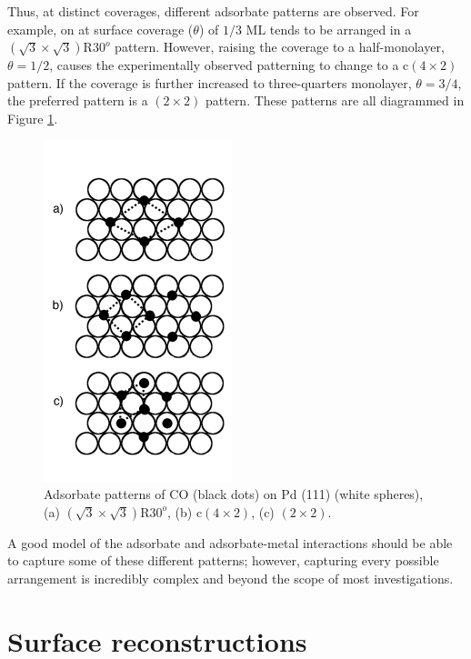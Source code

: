Thus, at distinct coverages, different adsorbate patterns are observed. For example,
 on  at surface coverage ($\theta$) of $1/3$ ML tends to be arranged in a
$(\sqrt{3}\times\sqrt{3})\textrm{R}30^o$ pattern. However, raising the coverage
to a half-monolayer, $\theta = 1/2$, causes the experimentally observed
patterning to change to a c$(4\times2)$ pattern. If the coverage is further
increased to three-quarters monolayer, $\theta = 3/4$, the preferred pattern is
a $(2\times2)$ pattern.\citep{Guo:1989aa} These patterns are all diagrammed in
Figure \ref{fig:patterns}.

\begin{figure}[p!]
\centering
  \includegraphics[width=0.5\linewidth]{../figures/chap1/pattern.pdf}
  \caption{Adsorbate patterns of CO (black dots) on Pd (111) (white spheres), (a)
$(\sqrt{3}\times\sqrt{3})\textrm{R}30^o$, (b) c$(4\times2)$, (c) $(2\times2)$.}
\label{fig:patterns}
\end{figure}

A good model of the adsorbate and adsorbate-metal interactions should be able
to capture some of these different patterns; however, capturing every possible
arrangement is incredibly complex and beyond the scope of most
investigations.

\section{Surface reconstructions}

